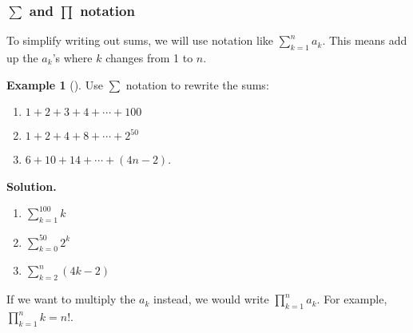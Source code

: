 \documentclass[10pt,]{book}
\theoremstyle{plain}
\theoremstyle{definition}
\theoremstyle{definition}
\newtheorem{example}[theorem]{Example}
\theoremstyle{definition}
\theoremstyle{definition}
\numberwithin{equation}{chapter}
\renewcommand{\d}{\displaystyle}
\begin{document}
\subsubsection[{\(\sum\) and \(\prod\) notation}]{\(\sum\) and \(\prod\) notation}\label{subsubsection-3}
\hypertarget{p-168}{}%
To simplify writing out sums, we will use notation like \(\d\sum_{k=1}^n a_k\). This means add up the \(a_k\)'s where \(k\) changes from 1 to \(n\).%
\begin{example}[]\label{example-13}
\hypertarget{p-169}{}%
Use \(\sum\) notation to rewrite the sums:%
\par
\hypertarget{p-170}{}%
\leavevmode%
\begin{enumerate}
\item\hypertarget{li-91}{}\(1 + 2 + 3 + 4 + \cdots + 100\)%
\item\hypertarget{li-92}{}\(1 + 2 + 4 + 8 + \cdots + 2^{50}\)%
\item\hypertarget{li-93}{}\(6 + 10 + 14 + \cdots + (4n - 2)\).%
\end{enumerate}
%
\par\smallskip%
\noindent\textbf{Solution.}\hypertarget{solution-15}{}\quad%
\hypertarget{p-171}{}%
\leavevmode%
\begin{enumerate}
\item\hypertarget{li-94}{}\(\d\sum_{k=1}^{100} k\)%
\item\hypertarget{li-95}{}\(\d\sum_{k=0}^{50} 2^k\)%
\item\hypertarget{li-96}{}\(\d\sum_{k=2}^{n} (4k -2)\)%
\end{enumerate}
%
\end{example}
\hypertarget{p-172}{}%
If we want to multiply the \(a_k\) instead, we would write \(\d\prod_{k=1}^n a_k\). For example, \(\d\prod_{k=1}^n k = n!\).%
\typeout{************************************************}
\typeout{************************************************}
\end{document}

